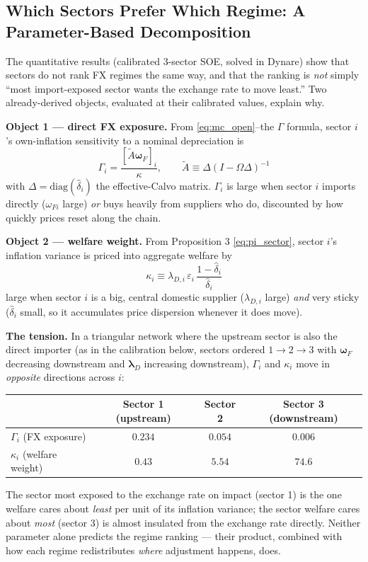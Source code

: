 \documentclass[12pt]{article}
\begin{document}
\subsection{Which Sectors Prefer Which Regime: A Parameter-Based Decomposition}
\label{sec:sector_regime_pref}

The quantitative results (calibrated 3-sector SOE, solved in Dynare) show that sectors do not rank FX regimes the same way, and that the ranking is \emph{not} simply ``most import-exposed sector wants the exchange rate to move least.'' Two already-derived objects, evaluated at their calibrated values, explain why.

\textbf{Object 1 --- direct FX exposure.} From \eqref{eq:mc_open}--the $\Gamma$ formula, sector $i$'s own-inflation sensitivity to a nominal depreciation is
\begin{equation}
    \Gamma_i = \frac{[\tilde{A}\bm{\omega}_F]_i}{\kappa}, \qquad \tilde{A} \equiv \Delta(I-\Omega\Delta)^{-1}
    \label{eq:Gamma_i_reprise}
\end{equation}
with $\Delta=\mathrm{diag}(\hat\delta_i)$ the effective-Calvo matrix. $\Gamma_i$ is large when sector $i$ imports directly ($\omega_{Fi}$ large) \emph{or} buys heavily from suppliers who do, discounted by how quickly prices reset along the chain.

\textbf{Object 2 --- welfare weight.} From Proposition 3 \eqref{eq:pi_sector}, sector $i$'s inflation variance is priced into aggregate welfare by
\begin{equation}
    \kappa_i \equiv \lambda_{D,i}\,\varepsilon_i\,\frac{1-\hat\delta_i}{\hat\delta_i}
    \label{eq:kappa_i_reprise}
\end{equation}
large when sector $i$ is a big, central domestic supplier ($\lambda_{D,i}$ large) \emph{and} very sticky ($\hat\delta_i$ small, so it accumulates price dispersion whenever it does move).

\textbf{The tension.} In a triangular network where the upstream sector is also the direct importer (as in the calibration below, sectors ordered $1\to2\to3$ with $\bm\omega_F$ decreasing downstream and $\bm\lambda_D$ increasing downstream), $\Gamma_i$ and $\kappa_i$ move in \emph{opposite} directions across $i$:
\begin{center}
\begin{tabular}{lccc}
\toprule
& Sector 1 (upstream) & Sector 2 & Sector 3 (downstream) \\
\midrule
$\Gamma_i$ (FX exposure) & $0.234$ & $0.054$ & $0.006$ \\
$\kappa_i$ (welfare weight) & $0.43$ & $5.54$ & $74.6$ \\
\bottomrule
\end{tabular}
\end{center}
The sector most exposed to the exchange rate on impact (sector 1) is the one welfare cares about \emph{least} per unit of its inflation variance; the sector welfare cares about \emph{most} (sector 3) is almost insulated from the exchange rate directly. Neither parameter alone predicts the regime ranking --- their product, combined with how each regime redistributes \emph{where} adjustment happens, does.
\end{document}
